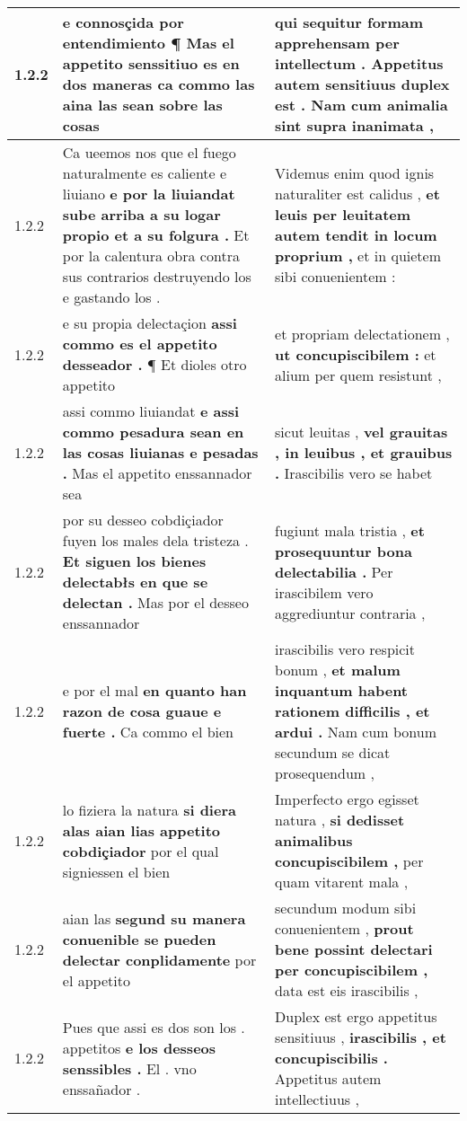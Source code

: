 \begin{tabular}{|p{1cm}|p{6.5cm}|p{6.5cm}|}
1.2.2 & e connosçida por entendimiento ¶ \textbf{ Mas el appetito senssitiuo es en dos maneras } ca commo las aina las sean sobre las cosas & qui sequitur formam apprehensam per intellectum . \textbf{ Appetitus autem sensitiuus duplex est . } Nam cum animalia sint supra inanimata , \\\hline
1.2.2 & Ca ueemos nos que el fuego naturalmente es caliente e liuiano \textbf{ e por la liuiandat sube arriba a su logar propio et a su folgura . } Et por la calentura obra contra sus contrarios destruyendo los e gastando los . & Videmus enim quod ignis naturaliter est calidus , \textbf{ et leuis per leuitatem autem tendit in locum proprium , } et in quietem sibi conuenientem : \\\hline
1.2.2 & e su propia delectaçion \textbf{ assi commo es el appetito desseador . } ¶ Et dioles otro appetito & et propriam delectationem , \textbf{ ut concupiscibilem : } et alium per quem resistunt , \\\hline
1.2.2 & assi commo liuiandat \textbf{ e assi commo pesadura sean en las cosas liuianas e pesadas . } Mas el appetito enssannador sea & sicut leuitas , \textbf{ vel grauitas , in leuibus , et grauibus . } Irascibilis vero se habet \\\hline
1.2.2 & por su desseo cobdiçiador fuyen los males dela tristeza . \textbf{ Et siguen los bienes delectabłs en que se delectan . } Mas por el desseo enssannador & fugiunt mala tristia , \textbf{ et prosequuntur bona delectabilia . } Per irascibilem vero aggrediuntur contraria , \\\hline
1.2.2 & e por el mal \textbf{ en quanto han razon de cosa guaue e fuerte . } Ca commo el bien & irascibilis vero respicit bonum , \textbf{ et malum inquantum habent rationem difficilis , et ardui . } Nam cum bonum secundum se dicat prosequendum , \\\hline
1.2.2 & lo fiziera la natura \textbf{ si diera alas aian lias appetito cobdiçiador } por el qual signiessen el bien & Imperfecto ergo egisset natura , \textbf{ si dedisset animalibus concupiscibilem , } per quam vitarent mala , \\\hline
1.2.2 & aian las \textbf{ segund su manera conuenible se pueden delectar conplidamente } por el appetito & secundum modum sibi conuenientem , \textbf{ prout bene possint delectari per concupiscibilem , } data est eis irascibilis , \\\hline
1.2.2 & Pues que assi es dos son los . appetitos \textbf{ e los desseos senssibles . } El . vno enssañador . & Duplex est ergo appetitus sensitiuus , \textbf{ irascibilis , et concupiscibilis . } Appetitus autem intellectiuus , \\\hline

\end{tabular}
